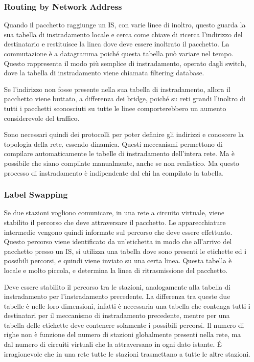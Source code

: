 \documentclass{article}
\numberwithin{equation}{subsection}
\begin{document}

\subsubsection{Routing by Network Address}

Quando il pacchetto raggiunge un IS, con varie linee di inoltro, questo guarda la sua tabella di instradamento locale e cerca come chiave di ricerca l'indirizzo del 
destinatario e restituisce la linea dove deve essere inoltrato il pacchetto. La commutazione è a datagramma poiché questa tabella può variare nel tempo. Questo 
rappresenta il modo più semplice di instradamento, operato dagli switch, dove la tabella di instradamento viene chiamata filtering database. 

Se l'indirizzo non fosse presente nella sua tabella di instradamento, allora il pacchetto viene buttato, a differenza dei bridge, poiché su reti grandi l'inoltro di 
tutti i pacchetti sconosciuti su tutte le linee comporterebbero un aumento considerevole del traffico. 

Sono necessari quindi dei protocolli per poter definire gli indirizzi e conoscere la topologia della rete, essendo dinamica. Questi meccanismi permettono di 
compilare automaticamente le tabelle di instradamento dell'intera rete. Ma è possibile che siano compilate manualmente, anche se non realistico. Ma questo processo 
di instradamento è indipendente dal chi ha compilato la tabella. 

\subsubsection{Label Swapping}

Se due stazioni vogliono comunicare, in una rete a circuito virtuale, viene stabilito il percorso che deve attraversare il pacchetto. Le apparecchiature intermedie 
vengono quindi informate sul percorso che deve essere effettuato. Questo percorso viene identificato da un'etichetta in modo che all'arrivo del pacchetto presso un IS, 
si utilizza una tabella dove sono presenti le etichette ed i possibili percorsi, e quindi viene inviato su una certa linea. Questa tabella è locale e molto piccola, e 
determina la linea di ritrasmissione del pacchetto. 

Deve essere stabilito il percorso tra le stazioni, analogamente alla tabella di instradamento per l'instradamento precedente. La differenza tra queste due tabelle 
è nelle loro dimensioni, infatti è necessaria una tabella che contenga tutti i destinatari per il meccanismo di instradamento precedente, mentre per una tabella 
delle etichette deve contenere solamente i possibili percorsi. Il numero di righe non è funzione del numero di stazioni globalmente presenti nella rete, ma dal numero 
di circuiti virtuali che la attraversano in ogni dato istante. \'{E} irragionevole che in una rete tutte le stazioni trasmettano a tutte le altre stazioni. 
\end{document}
